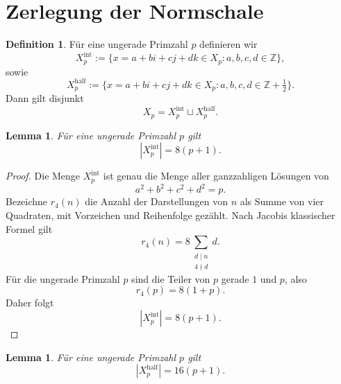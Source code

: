 \documentclass[12pt,a4paper]{article}
\theoremstyle{plain}
\newtheorem{lemma}[satz]{Lemma}
\theoremstyle{definition}
\newtheorem{definition}[satz]{Definition}
\theoremstyle{remark}
\newcommand{\Z}{\mathbb Z}
\begin{document}
	\section{Zerlegung der Normschale}
	
	\begin{definition}
		Für eine ungerade Primzahl \(p\) definieren wir
		\[
		X_p^{\mathrm{int}}
		:=
		\{x=a+bi+cj+dk\in X_p : a,b,c,d\in\Z\},
		\]
		sowie
		\[
		X_p^{\mathrm{half}}
		:=
		\{x=a+bi+cj+dk\in X_p : a,b,c,d\in \Z+\tfrac12\}.
		\]
		Dann gilt disjunkt
		\[
		X_p=X_p^{\mathrm{int}}\sqcup X_p^{\mathrm{half}}.
		\]
	\end{definition}
	
	\begin{lemma}
		Für eine ungerade Primzahl \(p\) gilt
		\[
		|X_p^{\mathrm{int}}|=8(p+1).
		\]
	\end{lemma}
	
	\begin{proof}
		Die Menge \(X_p^{\mathrm{int}}\) ist genau die Menge aller ganzzahligen Lösungen von
		\[
		a^2+b^2+c^2+d^2=p.
		\]
		Bezeichne \(r_4(n)\) die Anzahl der Darstellungen von \(n\) als Summe von vier Quadraten, mit Vorzeichen und Reihenfolge gezählt. Nach Jacobis klassischer Formel gilt
		\[
		r_4(n)=8\sum_{\substack{d\mid n\\4\nmid d}} d.
		\]
		Für die ungerade Primzahl \(p\) sind die Teiler von \(p\) gerade \(1\) und \(p\), also
		\[
		r_4(p)=8(1+p).
		\]
		Daher folgt
		\[
		|X_p^{\mathrm{int}}|=8(p+1).
		\]
	\end{proof}
	
	\begin{lemma}
		Für eine ungerade Primzahl \(p\) gilt
		\[
		|X_p^{\mathrm{half}}|=16(p+1).
		\]
	\end{lemma}
	
\end{document}
